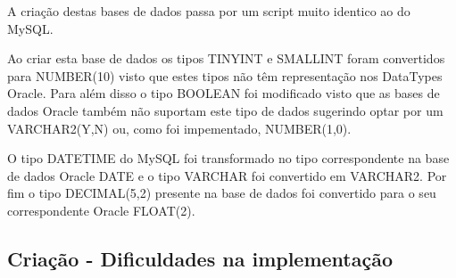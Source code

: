 \par A criação destas bases de dados passa por um script muito identico ao do MySQL.\newline
\par Ao criar esta base de dados os tipos TINYINT e SMALLINT foram convertidos para NUMBER(10) visto que estes tipos não têm representação nos DataTypes Oracle. Para além disso o tipo BOOLEAN foi modificado visto que as bases de dados Oracle também não suportam este tipo de dados sugerindo optar por um VARCHAR2(Y,N) ou, como foi impementado, NUMBER(1,0).
\par O tipo DATETIME do MySQL foi transformado no tipo correspondente na base de dados Oracle DATE e o tipo VARCHAR foi convertido em VARCHAR2. Por fim o tipo DECIMAL(5,2) presente na base de dados foi convertido para o seu correspondente Oracle FLOAT(2).

\subsection{Criação - Dificuldades na implementação}

